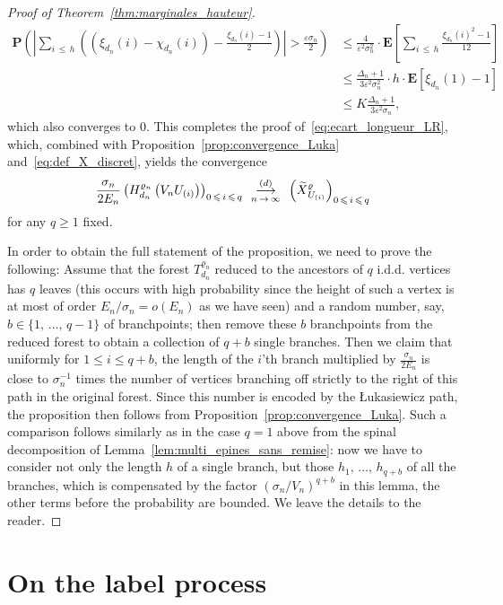 \documentclass[AHL,Unicode,longabstracts,published]{cedram}
\newcommand{\ensembles}[1]{\mathbf{#1}}
\renewcommand{\P}{\ensembles{P}}
\newcommand{\E}{\ensembles{E}}
\renewcommand{\Pr}[1]{\P\left(#1\right)}
\newcommand{\Es}[1]{\E\left[#1\right]}
\newcommand{\1}{\ensembles{1}}
\newcommand{\tildep}[1]{\widetilde{#1}\vphantom{#1}}
\renewcommand{\le}{\leqslant}
\renewcommand{\ge}{\geqslant}
\newcommand{\fn}{T_{d_n}^{\varrho_n}}
\newcommand{\Hfn}{H_{d_n}^{\varrho_n}}
\newcommand{\tX}{\tildep{X}^{\varrho}}
\newcommand{\edges}{E}
\newcommand{\vertices}{V}
\newcommand{\cvloi}[1][n]{\enskip\mathop{\longrightarrow}^{(d)}_{#1\,\to\, \infty}\enskip}
\begin{document}
\begin{proof}[Proof of Theorem~\ref{thm:marginales_hauteur}]
\begin{align*}
\Pr{\left|\sum_{i\,\le\,h} \left(\left(\xi_{d_n}(i) - \chi_{d_n}(i)\right) - \frac{\xi_{d_n}(i) - 1}{2}\right)\right| > \frac{\varepsilon \sigma_n}{2}}
&\le \frac{4}{\varepsilon^2 \sigma_n^2} \cdot \Es{\sum_{i\,\le\,h} \frac{\xi_{d_n}(i)^2 - 1}{12}}
\\
&\le \frac{\Delta_n+1}{3 \varepsilon^2 \sigma_n^2} \cdot h \cdot \Es{\xi_{d_n}(1) - 1}
\\
&\le K \frac{\Delta_n+1}{3 \varepsilon^2 \sigma_n},
\end{align*}
which also converges to $0$. This completes the proof of~\eqref{eq:ecart_longueur_LR}, which, combined with Proposition~\ref{prop:convergence_Luka} and~\eqref{eq:def_X_discret}, yields the convergence
\[
\frac{\sigma_n}{2 \edges_n} \left(\Hfn\left(\vertices_n U_{(i)}\right)\right)_{0\,\le\,i\,\le\,q}
\cvloi
\left(\tX_{U_{(i)}}\right)_{0\,\le\,i\,\le\,q}
\]
for any $q \ge 1$ fixed.

In order to obtain the full statement of the proposition, we need to prove the following: Assume that the forest $\fn$ reduced to the ancestors of $q$ i.d.d. vertices has $q$ leaves (this occurs with high probability since the height of such a vertex is at most of order $\edges_n / \sigma_n = o(\edges_n)$ as we have seen) and a random number, say, $b \in \{1,\,\dots,\, q-1\}$ of branchpoints; then remove these $b$ branchpoints from the reduced forest to obtain a collection of $q+b$ single branches. Then we claim that uniformly for $1 \le i \le q+b$, the length of the $i$'th branch multiplied by $\frac{\sigma_n}{2 \edges_n}$ is close to $\sigma_n^{-1}$ times the number of vertices branching off strictly to the right of this path in the original forest. Since this number is encoded by the {\L}ukasiewicz path, the proposition then follows from Proposition~\ref{prop:convergence_Luka}. Such a comparison follows similarly as in the case $q=1$ above from the spinal decomposition of Lemma~\ref{lem:multi_epines_sans_remise}: now we have to consider not only the length $h$ of a single branch, but those $h_1,\,\dots,\,h_{q+b}$ of all the branches, which is compensated by the factor $(\sigma_n / \vertices_n)^{q+b}$ in this lemma, the other terms before the probability are bounded. We leave the details to the reader.
\end{proof}



\section{On the label process}\label{sec:etiquettes}
\end{document}
